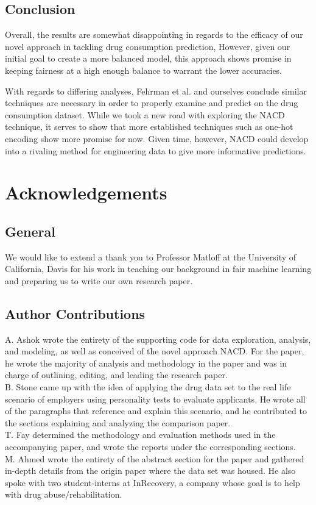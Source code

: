 \documentclass{article}
\begin{document}
    \subsection{Conclusion}
    Overall, the results are somewhat disappointing in regards to the efficacy of our novel approach in tackling drug consumption prediction, However, given our initial goal to create a more balanced model, this approach shows promise in keeping fairness at a high enough balance to warrant the lower accuracies.

    With regards to differing analyses, Fehrman et al. and ourselves conclude similar techniques are necessary in order to properly examine and predict on the drug consumption dataset. While we took a new road with exploring the NACD technique, it serves to show that more established techniques such as one-hot encoding show more promise for now. Given time, however, NACD could develop into a rivaling method for engineering data to give more informative predictions.


\section{Acknowledgements}
    \subsection*{General}
    We would like to extend a thank you to Professor Matloff at the University of California, Davis for his work in teaching our background in fair machine learning and preparing us to write our own research paper.
    
    \subsection*{Author Contributions} 
    A. Ashok wrote the entirety of the supporting code for data exploration, analysis, and modeling, as well as conceived of the novel approach NACD. For the paper, he wrote the majority of analysis and methodology in the paper and was in charge of outlining, editing, and leading the research paper. \\
    B. Stone came up with the idea of applying the drug data set to the real life scenario of employers using personality tests to evaluate applicants. He wrote all of the paragraphs that reference and explain this scenario, and he contributed to the sections explaining and analyzing the comparison paper.\\
    T. Fay determined the methodology and evaluation methods used in the accompanying paper, and wrote the reports under the corresponding sections. \\
    M. Ahmed wrote the entirety of the abstract section for the paper and gathered in-depth details from the origin paper where the data set was housed. He also spoke with two student-interns at InRecovery, a company whose goal is to help with drug abuse/rehabilitation. \\
\end{document}
